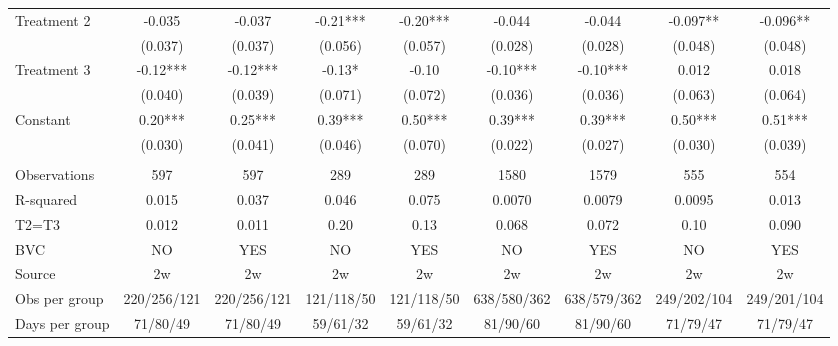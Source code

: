 \begin{tabular}{lcccccccc}
\midrule
\midrule
Treatment 2 & -0.035 & -0.037 & -0.21*** & -0.20*** & -0.044 & -0.044 & -0.097** & -0.096** \\
      & (0.037) & (0.037) & (0.056) & (0.057) & (0.028) & (0.028) & (0.048) & (0.048) \\
Treatment 3 & -0.12*** & -0.12*** & -0.13* & -0.10 & -0.10*** & -0.10*** & 0.012 & 0.018 \\
      & (0.040) & (0.039) & (0.071) & (0.072) & (0.036) & (0.036) & (0.063) & (0.064) \\
Constant  & 0.20*** & 0.25*** & 0.39*** & 0.50*** & 0.39*** & 0.39*** & 0.50*** & 0.51*** \\
      & (0.030) & (0.041) & (0.046) & (0.070) & (0.022) & (0.027) & (0.030) & (0.039) \\
      &       &       &       &       &       &       &       &  \\
\midrule
Observations & 597   & 597   & 289   & 289   & 1580  & 1579  & 555   & 554 \\
R-squared & 0.015 & 0.037 & 0.046 & 0.075 & 0.0070 & 0.0079 & 0.0095 & 0.013 \\
T2=T3 & 0.012 & 0.011 & 0.20  & 0.13  & 0.068 & 0.072 & 0.10  & 0.090 \\
BVC   & NO    & YES   & NO    & YES   & NO    & YES   & NO    & YES \\
Source & 2w    & 2w    & 2w    & 2w    & 2w    & 2w    & 2w    & 2w \\
Obs per group & 220/256/121 & 220/256/121 & 121/118/50 & 121/118/50 & 638/580/362 & 638/579/362 & 249/202/104 & 249/201/104 \\
Days per group & 71/80/49 & 71/80/49 & 59/61/32 & 59/61/32 & 81/90/60 & 81/90/60 & 71/79/47 & 71/79/47 \\
\bottomrule
\bottomrule
\end{tabular}%
